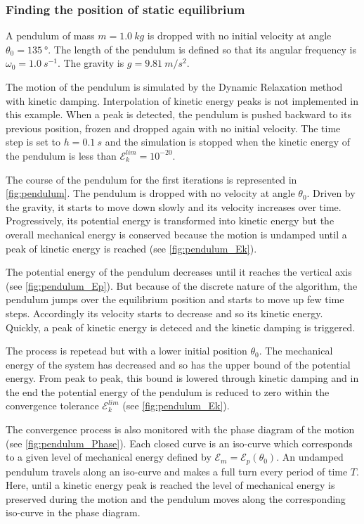 \subsubsection{Finding the position of static equilibrium}
A pendulum of mass $m = \SI{1.0}{kg}$ is dropped with no initial velocity at angle $\theta_0 = \SI{135}{\degree}$. The length of the pendulum is defined so that its angular frequency is $\omega_0 = \SI{1.0}{s^{-1}}$. The gravity is $g = \SI{9.81}{m/s^2}$.

The motion of the pendulum is simulated by the Dynamic Relaxation method with kinetic damping. Interpolation of kinetic energy peaks is not implemented in this example. When a peak is detected, the pendulum is pushed backward to its previous position, frozen and dropped again with no initial velocity. The time step is set to $h = \SI{0.1}{s}$ and the simulation is stopped when the kinetic energy of the pendulum is less than $\mathcal{E}_k^{lim} = 10^{-20}$.

The course of the pendulum for the first iterations is represented in \cref{fig:pendulum}. The pendulum is dropped with no velocity at angle $\theta_0$. Driven by the gravity, it starts to move down slowly and its velocity increases over time. Progressively, its potential energy is transformed into kinetic energy but the overall mechanical energy is conserved because the motion is undamped until a peak of kinetic energy is reached (see \cref{fig:pendulum_Ek}).

The potential energy of the pendulum decreases until it reaches the vertical axis (see \cref{fig:pendulum_Ep}). But because of the discrete nature of the algorithm, the pendulum jumps over the equilibrium position and starts to move up few time steps. Accordingly its velocity starts to decrease and so its kinetic energy. Quickly, a peak of kinetic energy is deteced and the kinetic damping is triggered.

The process is repetead but with a lower initial position $\theta_0$. The mechanical energy of the system has decreased and so has the upper bound of the potential energy. From peak to peak, this bound is lowered through kinetic damping and in the end the potential energy of the pendulum is reduced to zero within the convergence tolerance $\mathcal{E}_k^{lim}$ (see \cref{fig:pendulum_Ek}).

The convergence process is also monitored with the phase diagram of the motion (see \cref{fig:pendulum_Phase}). Each closed curve is an iso-curve which corresponds to a given level of mechanical energy defined by $\mathcal{E}_m = \mathcal{E}_p(\theta_0)$. An undamped pendulum travels along an iso-curve and makes a full turn every period of time $T$. Here, until a kinetic energy peak is reached the level of mechanical energy is preserved during the motion and the pendulum moves along the corresponding iso-curve in the phase diagram.

